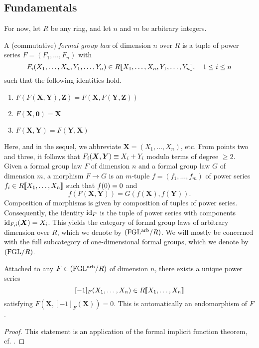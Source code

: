 \documentclass[../main.tex]{subfiles}
\begin{document}
\subsection{Fundamentals} %
\label{sub:Basic Notions}
For now, let $R$ be any ring, and let $n$ and $m$ be arbitrary integers.
\begin{defi}
  A (commutative) \emph{formal group law} of dimension
  $n$ over $R$ is a tuple of
  power series $F = (F_1, \dots, F_n)$ with $$F_i(X_1, \dots, X_n,Y_1,
  \dots, Y_n) \in R\llbracket X_1, \dots,
  X_n, Y_1, \dots, Y_n\rrbracket, \quad 1 \leq i \leq n$$
  such that the following identities hold.
  \begin{enumerate}
    \item $F(F (\mathbf X, \mathbf Y), \mathbf Z) = 
      F(\mathbf X, F(\mathbf Y, \mathbf Z))$
    \item $F( \mathbf X, \mathbf 0) = \mathbf X$
    \item $F( \mathbf X, \mathbf Y) = F(\mathbf Y, \mathbf X)$
  \end{enumerate}
  Here, and in the sequel, we abbreviate $\mathbf X =
  (X_1, \dots, X_n)$, etc. From points two and three, it follows that 
  $F_i(\boldsymbol{X}, \boldsymbol{Y}) \equiv X_i + Y_i$ modulo terms of degree $\geq 2$.
  Given a formal group law $F$ of dimension $n$ and a formal group law
  $G$ of dimension $m$,
  a morphism $F \to G$ is an $m$-tuple $f = (f_1, \dots, f_m)$ 
  of power series $f_i \in R\llbracket X_1, \dots, X_n \rrbracket$ such that ${f}(0)=0$ and
  \begin{equation*}
    f(F( \mathbf X, \mathbf Y)) = G(f( \mathbf X), f( \mathbf Y) ).
  \end{equation*}
  Composition of morphisms is given by composition of tuples of power series. 
  Consequently, the identity $\operatorname{id}_{F}$ is the tuple of power series with
  components $\operatorname{id}_{F,i}( \boldsymbol X) = X_i$. 
  This yields the category of formal group laws of arbitrary dimension over $R$,
  which we denote by ${(\mathrm{FGL^{arb}}/{R})}$. We will mostly be concerned with the full
  subcategory of one-dimensional formal groups, which we denote by ${(\mathrm{FGL}/{R})}$. 
\end{defi}

\begin{lem}\label{lem:FGLAdditive}
    Attached to any $F \in {(\mathrm{FGL^{arb}}/{R})}$ of dimension $n$, there exists a unique power series 
      $$[-1]_F(X_1, \dots, X_n) \in R\llbracket X_1, \dots, X_n\rrbracket$$
      satisfying $F(\mathbf X, [-1]_F(\mathbf X)) = 0$. This is automatically an endomorphism of $F$. 
\end{lem}
\begin{proof}
    This statement is an application of the formal implicit function theorem,
    cf. \cite[Theorem A.4.7]{hazewinkel1978formal}.   
\end{proof}
\end{document}
